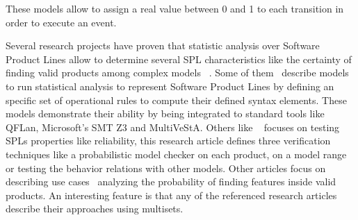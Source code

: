 \begin{figure}[h]
\begin{minipage}{0.4\hsize}
		
		\begin{minipage}{0.2\hsize}
		\end{minipage}
		
	\end{minipage}
	
\end{figure}

These models allow to assign a real value
between 0 and 1 to each transition in order to execute
an event.

Several research projects have proven that
statistic analysis over Software Product
Lines allow to determine several SPL characteristics
like the certainty of finding valid products among
complex models ~\cite{tllv15,tlll15,chssgl13,dpcslsh17}.
Some of them~\cite{tllv15,tlll15} describe models
to run statistical analysis to represent Software
Product Lines by defining an specific set of operational
rules to compute their defined syntax elements.
These models demonstrate their ability by being
integrated to standard tools like QFLan, Microsoft's
SMT Z3 and MultiVeStA. Others like ~\cite{chssgl13}
focuses on testing SPLs properties like reliability,
this research article defines three verification
techniques like a probabilistic model checker on
each product, on a model range or testing the behavior
relations with other models. Other articles focus on
describing use cases~\cite{dpcslsh17} analyzing the
probability of finding features inside valid products.
An interesting feature is that any of the referenced
research articles describe their approaches using multisets.








